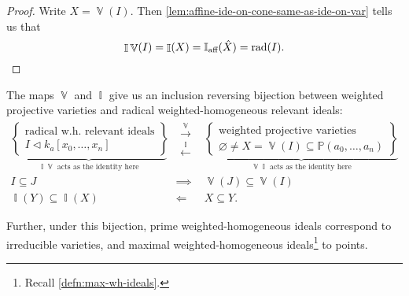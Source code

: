 \documentclass[10pt,notitlepage]{article}
\numberwithin{equation}{subsection}
\DeclareMathOperator{\van}{\mathbb{V}}
\DeclareMathOperator{\ide}{\mathbb{I}}
\DeclareMathOperator{\rad}{rad}
\DeclareMathOperator{\ideaff}{\mathbb{I}_{\textnormal{aff}}}
\newcommand{\pee}{\mathbb{P}}
\newcommand{\kazn}{k_a[x_0,\ldots,x_n]}
\newcommand{\pazn}{\pee(a_0,\ldots,a_n)}
\begin{document}
    \begin{proof}
        Write $X=\van(I)$.
        Then \cref{lem:affine-ide-on-cone-same-as-ide-on-var} tells us that
        \[
            \ide\van(I) = \ide(X) = \ideaff(\hat{X}) = \rad(I).\qedhere
        \]
    \end{proof}

    \begin{corollary}\label{cor:applied-wp-null}
        The maps $\van$ and $\ide$ give us an inclusion reversing bijection between weighted projective varieties and radical weighted-homogeneous relevant ideals:
        \[
            \begin{array}{rcl}
                \underbrace{\left\{
                \begin{array}{c}
                    \text{radical w.h. relevant ideals}\\
                    I\triangleleft\kazn
                \end{array}
                \right\}}_{\ide\van\text{ acts as the identity here}}
                &\begin{array}{c}
                    \overset{\van}{\longrightarrow}\\
                    \overset{\ide}{\longleftarrow}
                \end{array}
                &\underbrace{\left\{
                \begin{array}{c}
                    \text{weighted projective varieties}\\
                    \varnothing\neq X=\van(I)\subseteq\pazn
                \end{array}
                \right\}}_{\van\ide\text{ acts as the identity here}}\\[3em]
                I\subseteq J &\implies &\van(J)\subseteq\van(I)\\
                \ide(Y)\subseteq \ide(X) &\Longleftarrow &X\subseteq Y.
            \end{array}
        \]

        Further, under this bijection, prime weighted-homogeneous ideals correspond to irreducible varieties, and maximal weighted-homogeneous ideals\footnote{Recall \cref{defn:max-wh-ideals}.} to points.
    \end{corollary}
\end{document}
